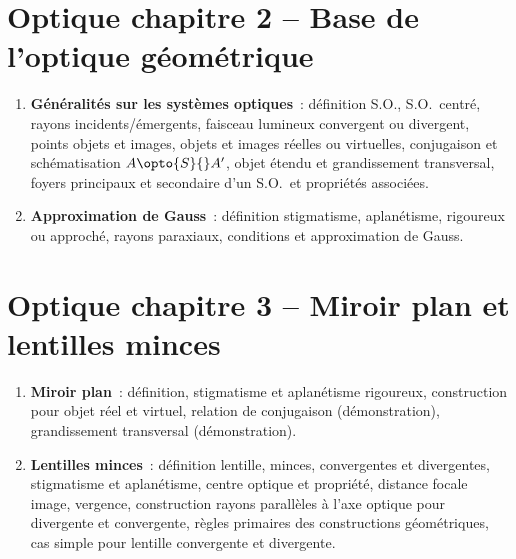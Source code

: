 \documentclass[a4paper, 12pt, final, garamond]{book}
\begin{document}
\section*{Optique chapitre 2 -- Base de l'optique géométrique}
\begin{enumerate}[label=\Roman*, start=3]
    \item \textbf{Généralités sur les systèmes optiques}~: définition S.O.,
        S.O.\ centré, rayons incidents/émergents, faisceau lumineux convergent
        ou divergent, points objets et images, objets et images réelles ou
        virtuelles, conjugaison et schématisation $A \opto{S}{}A'$, objet étendu
        et grandissement transversal, foyers principaux et secondaire d'un S.O.\
        et propriétés associées.
    \item \textbf{Approximation de Gauss}~: définition stigmatisme, aplanétisme,
        rigoureux ou approché, rayons paraxiaux, conditions et approximation de
        Gauss.
\end{enumerate}

\section*{Optique chapitre 3 -- Miroir plan et lentilles minces}
\begin{enumerate}[label=\Roman*]
    \item \textbf{Miroir plan}~: définition, stigmatisme et aplanétisme
        rigoureux, construction pour objet réel et virtuel, relation de
        conjugaison (démonstration), grandissement transversal (démonstration).
    \item \textbf{Lentilles minces}~: définition lentille, minces, convergentes
        et divergentes, stigmatisme et aplanétisme, centre optique et propriété,
        distance focale image, vergence, construction rayons parallèles à l'axe
        optique pour divergente et convergente, règles primaires des
        constructions géométriques, cas simple pour lentille convergente et
        divergente.
\end{enumerate}
\end{document}
